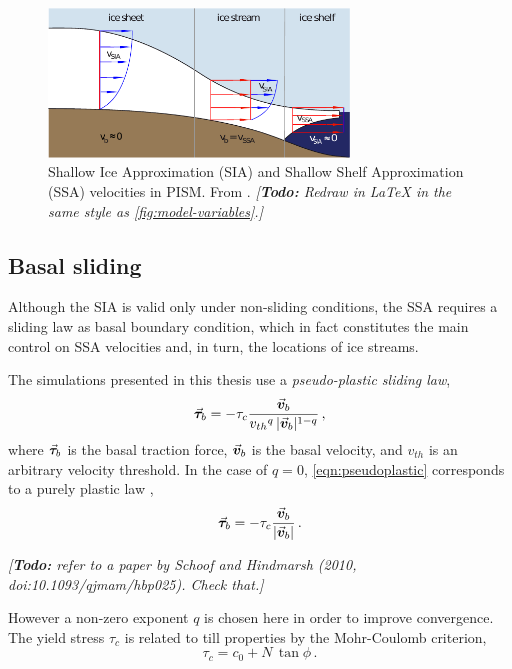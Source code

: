 \documentclass{article}
\newcommand{\todo}[1]{\emph{[\textbf{Todo:} #1]}}
\newcommand{\vect}[1]{\va*{#1}} %
\newcommand{\vv}[0]{\vect{v}}           %
\begin{document}
\begin{figure}
  \centering
  \includegraphics[width=80mm]{model-siassa}
  \caption{Shallow Ice Approximation (SIA) and Shallow Shelf Approximation
           (SSA) velocities in PISM. From \citet{Winkelmann.etal.2011}.
           \todo{Redraw in LaTeX in the same style as
                 \cref{fig:model-variables}.}}
  \label{fig:model-siassa}
\end{figure}


\subsection{Basal sliding}

Although the SIA is valid only under non-sliding conditions, the SSA requires
a sliding law as basal boundary condition, which in fact constitutes the main
control on SSA velocities and, in turn, the locations of ice streams.

The simulations presented in this thesis use a \emph{pseudo-plastic sliding
law},
\begin{equation}
    \label{eqn:pseudoplastic}
    \vect{\tau}_b = -\tau_c \frac{\vv_b}{{v_{th}}^q\,|\vv_b|^{1-q}} \,,
\end{equation}
where $\vect{\tau}_b$ is the basal traction force, $\vv_b$ is the basal
velocity, and $v_{th}$ is an arbitrary velocity threshold. In the case of
$q=0$, \cref{eqn:pseudoplastic} corresponds to a purely plastic law
\citep[Eq.~11]{Winkelmann.etal.2011},
\begin{equation}
    \label{eqn:plastic}
    \vect{\tau}_b = -\tau_c \frac{\vv_b}{|\vv_b|} \,.
\end{equation}

\todo{\citep[supplement]{Aschwanden.etal.2013} refer to a paper by Schoof and
      Hindmarsh (2010, doi:10.1093/qjmam/hbp025). Check that.}

However a non-zero exponent $q$ is chosen here in order to improve convergence.
The yield stress $\tau_c$ is related to till properties by the Mohr-Coulomb
criterion,
\begin{equation}
   \tau_c = c_0 + N\,\tan{\phi} \,.
\end{equation}
\end{document}

